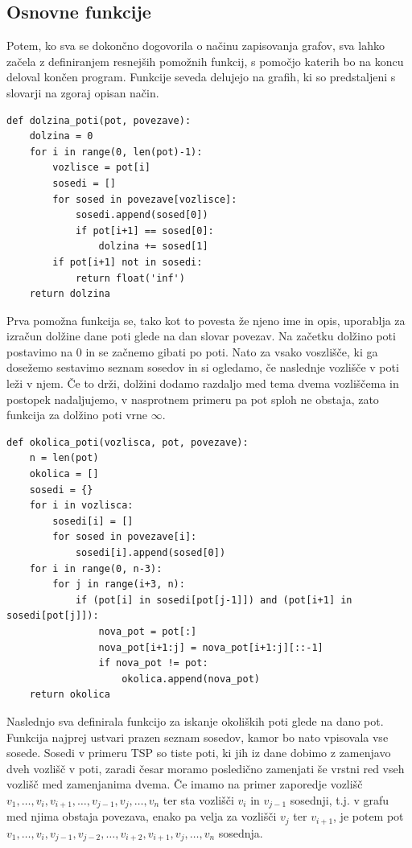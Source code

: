 \documentclass[10pt, a4paper]{article}
\begin{document}
\subsection{Osnovne funkcije}

Potem, ko sva se dokončno dogovorila o načinu zapisovanja grafov, sva lahko začela z definiranjem resnejših pomožnih funkcij, s pomočjo katerih bo na koncu deloval končen program. Funkcije seveda delujejo na grafih, ki so predstaljeni s slovarji na zgoraj opisan način.

\begin{verbatim}
def dolzina_poti(pot, povezave):
    dolzina = 0
    for i in range(0, len(pot)-1):
        vozlisce = pot[i]
        sosedi = []
        for sosed in povezave[vozlisce]:
            sosedi.append(sosed[0])
            if pot[i+1] == sosed[0]:
                dolzina += sosed[1]
        if pot[i+1] not in sosedi:
            return float('inf')
    return dolzina
\end{verbatim}

Prva pomožna funkcija se, tako kot to povesta že njeno ime in opis, uporablja za izračun dolžine dane poti glede na dan slovar povezav. Na začetku dolžino poti postavimo na 0 in se začnemo gibati po poti. Nato za vsako voszlišče, ki ga dosežemo sestavimo seznam sosedov in si ogledamo, če naslednje vozlišče v poti leži v njem. Če to drži, dolžini dodamo razdaljo med tema dvema vozliščema in postopek nadaljujemo, v nasprotnem primeru pa pot sploh ne obstaja, zato funkcija za dolžino poti vrne $\infty$.

\newpage

\begin{verbatim}
def okolica_poti(vozlisca, pot, povezave):
    n = len(pot)
    okolica = []
    sosedi = {}
    for i in vozlisca:
        sosedi[i] = []
        for sosed in povezave[i]:
            sosedi[i].append(sosed[0])
    for i in range(0, n-3):
        for j in range(i+3, n):
            if (pot[i] in sosedi[pot[j-1]]) and (pot[i+1] in sosedi[pot[j]]):
                nova_pot = pot[:]
                nova_pot[i+1:j] = nova_pot[i+1:j][::-1]
                if nova_pot != pot:
                    okolica.append(nova_pot)
    return okolica
\end{verbatim}

Naslednjo sva definirala funkcijo za iskanje okoliških poti glede na dano pot. Funkcija najprej ustvari prazen seznam sosedov, kamor bo nato vpisovala vse sosede. Sosedi v primeru TSP so tiste poti, ki jih iz dane dobimo z zamenjavo dveh vozlišč v poti, zaradi česar moramo posledično zamenjati še vrstni red vseh vozlišč med zamenjanima dvema. Če imamo na primer zaporedje vozlišč $v_1, \dots , v_i, v_{i+1}, \dots , v_{j-1}, v_j, \dots, v_n$ ter sta vozlišči $v_i$ in $v_{j-1}$ sosednji, t.j. v grafu med njima obstaja povezava, enako pa velja za vozlišči $v_j$ ter $v_{i+1}$, je potem pot $v_1, \dots , v_i, v_{j-1}, v_{j-2}, \dots ,v_{i+2}, v_{i+1}, v_j, \dots, v_n$ sosednja.  
\end{document}
